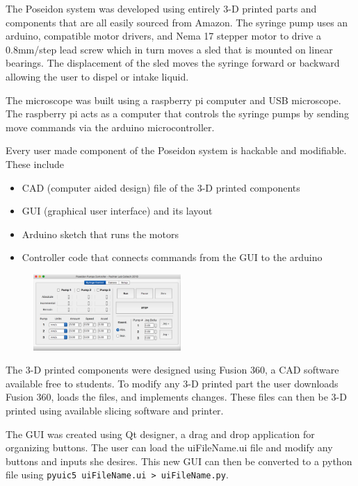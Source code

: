 \documentclass[10pt]{article} %
\begin{document}
\begin{minipage}[t]{.66\linewidth}
		The Poseidon system was developed using entirely 3-D printed parts and components that are all easily sourced from Amazon. The syringe pump uses an arduino, compatible motor drivers, and Nema 17 stepper motor to drive a 0.8mm/step lead screw which in turn moves a sled that is mounted on linear bearings. The displacement of the sled moves the syringe forward or backward allowing the user to dispel or intake liquid. 
		
		The microscope was built using a raspberry
		 pi computer and USB microscope. The raspberry pi acts as a computer that controls the syringe pumps by sending move commands via the arduino microcontroller. 
		

	
		
		
		\hypertarget{secondnews}{} %
		
		Every user made component of the Poseidon system is hackable and modifiable. These include
		
		\begin{itemize}
			\item CAD (computer aided design) file of the 3-D printed components
			\item GUI (graphical user interface) and its layout
			\item Arduino sketch that runs the motors
			\item Controller code that connects commands from the GUI to the arduino
		\end{itemize}
		\begin{figure} %
			\includegraphics[width=0.5\textwidth]{img/gui-example.png}
		\end{figure}
		The 3-D printed components were designed using Fusion 360, a CAD software available free to students. To modify any 3-D printed part the user downloads Fusion 360, loads the files, and implements changes. These files can then be 3-D printed using available slicing software and printer. 
		
		The GUI was created using Qt designer, a drag and drop application for organizing buttons. The user can load the uiFileName.ui file and modify any buttons and inputs she desires. This new GUI can then be converted to a python file using \texttt{pyuic5 uiFileName.ui > uiFileName.py}.
		
	\end{minipage} %
	
\end{document}
